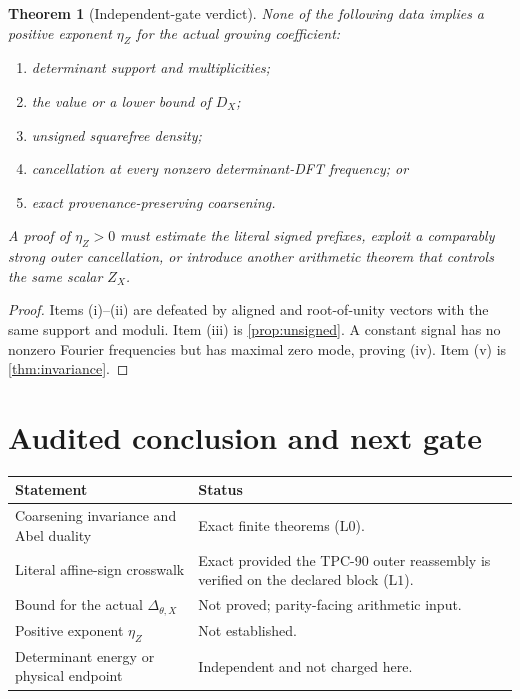 \documentclass[11pt,a4paper]{article}
\newtheorem{theorem}{Theorem}[section]
\theoremstyle{definition}
\theoremstyle{remark}
\newcommand{\Lzero}{\mathrm{L0}}
\newcommand{\Lone}{\mathrm{L1}}
\begin{document}
\begin{theorem}[Independent-gate verdict]
\label{thm:verdict}
None of the following data implies a positive exponent
\(\eta_Z\) for the actual growing coefficient:
\begin{enumerate}[label=(\roman*),leftmargin=2.2em]
\item determinant support and multiplicities;
\item the value or a lower bound of \(D_X\);
\item unsigned squarefree density;
\item cancellation at every nonzero determinant-DFT frequency; or
\item exact provenance-preserving coarsening.
\end{enumerate}
A proof of \(\eta_Z>0\) must estimate the literal signed prefixes,
exploit a comparably strong outer cancellation, or introduce another
arithmetic theorem that controls the same scalar \(Z_X\).
\end{theorem}

\begin{proof}
Items (i)--(ii) are defeated by aligned and root-of-unity vectors
with the same support and moduli.  Item (iii) is
\cref{prop:unsigned}.  A constant signal has no nonzero Fourier
frequencies but has maximal zero mode, proving (iv).  Item (v) is
\cref{thm:invariance}.
\end{proof}

\section{Audited conclusion and next gate}

\begin{center}
\small
\begin{tabularx}{\textwidth}{@{}p{}X@{}}
\toprule
Statement & Status\\
\midrule
Coarsening invariance and Abel duality
& Exact finite theorems (\(\Lzero\)).\\
Literal affine-sign crosswalk
& Exact provided the TPC-90 outer reassembly is verified on the
declared block (\(\Lone\)).\\
Bound for the actual \(\Delta_{\theta,X}\)
& Not proved; parity-facing arithmetic input.\\
Positive exponent \(\eta_Z\)
& Not established.\\
Determinant energy or physical endpoint
& Independent and not charged here.\\
\bottomrule
\end{tabularx}
\end{center}
\end{document}
